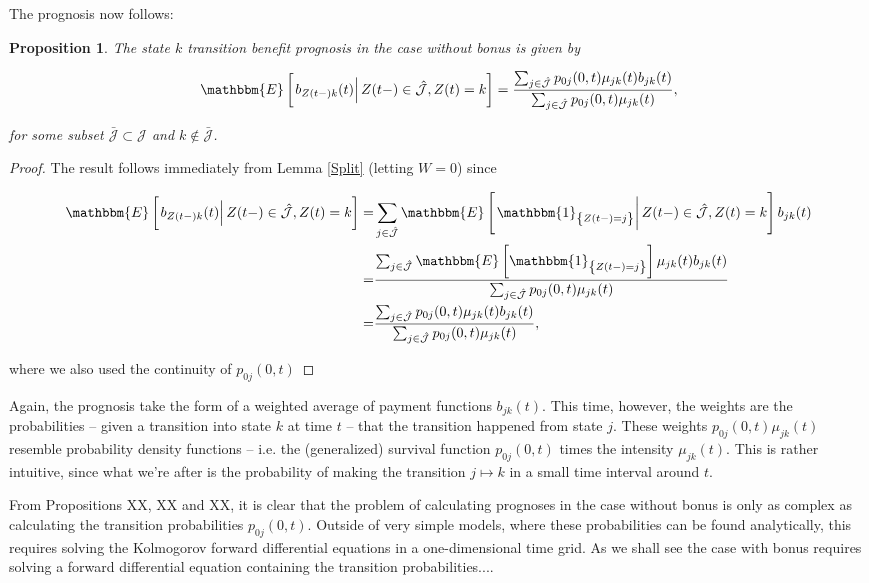 \documentclass{book}
\newcommand{\1}[1]{\mathbbm{1}_{\left\lbrace #1 \right\rbrace}}
\newcommand{\expec}[1][def]{\mathbbm{E} \left[ #1 \right]}
\newcommand{\econd}[2][def]{\mathbbm{E} \left[ \left. #1 \right| #2 \right]}
\theoremstyle{break}
\newtheorem{proposition}[definition]{Proposition}%
\theoremstyle{remark}
\newenvironment{remark}
  {\pushQED{\qed}\renewcommand{\qedsymbol}{\scalebox{1.4}{$\circ$}}\remarkx}
  {\popQED\endremarkx}
\numberwithin{equation}{section}
\begin{document}
The prognosis now follows:

\begin{proposition} \label{TransitionWithoutBonus}
The state $k$ transition benefit prognosis in the case without bonus is given by

\begin{align*}
    \econd[b_{Z(t-)k}(t)]{Z(t-) \in \hat{\mathcal{J}}, Z(t)=k} = \frac{\sum_{j \in \hat{\mathcal{J}}} p_{0j}(0,t) \mu_{jk}(t) b_{jk}(t)}{\sum_{j \in \hat{\mathcal{J}}} p_{0j}(0,t) \mu_{jk}(t)},
\end{align*}

for some subset $\bar{\mathcal{J}} \subset \mathcal{J}$ and $k \notin \bar{\mathcal{J}}$.
\end{proposition}
\begin{proof}
The result follows immediately from Lemma \ref{Split} (letting $W=0$) since

\begin{align*}
	\econd[b_{Z(t-)k}(t)]{Z(t-) \in \hat{\mathcal{J}}, Z(t)=k} =& \sum_{j \in \hat{\mathcal{J}}} \econd[\1{Z(t-)=j}]{Z(t-) \in \hat{\mathcal{J}}, Z(t) = k} b_{jk}(t) \\
	=&\frac{\sum_{j \in \hat{\mathcal{J}}} \expec[\1{Z(t-)=j}] \mu_{jk}(t) b_{jk}(t)}{\sum_{j \in \hat{\mathcal{J}}} p_{0j}(0,t) \mu_{jk}(t)} \\
	=&\frac{\sum_{j \in \hat{\mathcal{J}}} p_{0j}(0,t) \mu_{jk}(t) b_{jk}(t)}{\sum_{j \in \hat{\mathcal{J}}} p_{0j}(0,t) \mu_{jk}(t)},
\end{align*}

where we also used the continuity of $p_{0j}(0,t)$
\end{proof}

Again, the prognosis take the form of a weighted average of payment functions $b_{jk}(t)$. This time, however, the weights are the probabilities -- given a transition into state $k$ at time $t$ -- that the transition happened from state $j$. These weights $p_{0j}(0,t) \mu_{jk}(t)$ resemble probability density functions -- i.e. the (generalized) survival function $p_{0j}(0,t)$ times the intensity $\mu_{jk}(t)$. This is rather intuitive, since what we're after is the probability of making the transition $j \mapsto k$ in a small time interval around $t$.

\begin{remark}
	From Propositions XX, XX and XX, it is clear that the problem of calculating prognoses in the case without bonus is only as complex as calculating the transition probabilities $p_{0j}(0,t)$. Outside of very simple models, where these probabilities can be found analytically, this requires solving the Kolmogorov forward differential equations in a one-dimensional time grid. As we shall see the case with bonus requires solving a forward differential equation containing the transition probabilities....
\end{remark}
\end{document}
